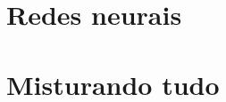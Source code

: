 \documentclass{article}
\begin{document}
\section{Redes neurais}

\section{Misturando tudo}

\nocite{*}
\printbibliography
\end{document}
